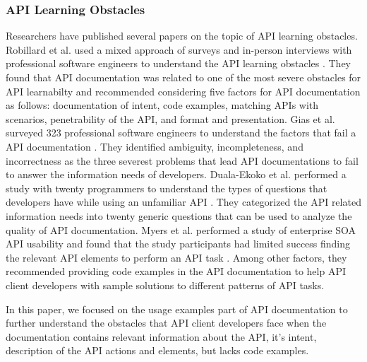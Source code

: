 \documentclass[conference]{IEEEtran}
\begin{document}
\subsubsection{API Learning Obstacles}
  Researchers have published several papers on the topic of API learning obstacles. Robillard et al. used a mixed approach of surveys and in-person interviews with professional software engineers to understand the API learning obstacles \cite{Robillard_what_makes} \cite{Robillard_a_field_study}. They found that API documentation was related to one of the most severe obstacles for API learnabilty and recommended considering five factors for API documentation as follows: documentation of intent, code examples, matching APIs with scenarios, penetrability of the API, and format and presentation. Gias et al. surveyed 323 professional software engineers to understand the factors that fail a API documentation \cite{g_uddin}. They identified ambiguity, incompleteness, and incorrectness as the three severest problems that lead API documentations to fail to answer the information needs of developers. Duala-Ekoko et al. performed a study with twenty programmers to understand the types of questions that developers have while using an unfamiliar API \cite{Duala-Ekoko:2012:AAQ:2337223.2337255}. They categorized the API related information needs into twenty generic questions that can be used to analyze the quality of API documentation. Myers et al. performed a study of enterprise SOA API usability and found that the study participants had limited success finding the relevant API elements to perform an API task \cite{Myers_study}. Among other factors, they recommended providing code examples in the API documentation to help API client developers with sample solutions to different patterns of API tasks.

  In this paper, we focused on the usage examples part of API documentation to further understand the obstacles that API client developers face when the documentation contains relevant information about the API, it's intent, description of the API actions and elements, but lacks code examples.
\end{document}
